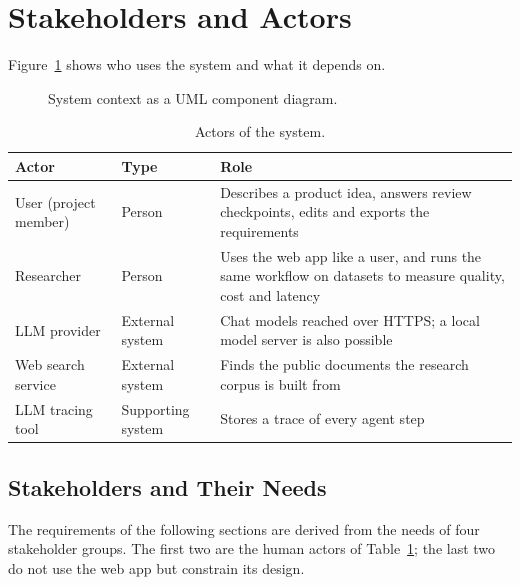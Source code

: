 \section{Stakeholders and Actors}
\label{sec:sd-actors}

Figure~\ref{fig:sd-context} shows who uses the system and what it depends on.

\begin{figure}[H]
    \centering
    \resizebox{\linewidth}{!}{}
    \caption{System context as a UML component diagram.}
    \label{fig:sd-context}
\end{figure}

\begin{table}[H]
    \centering
    \caption{Actors of the system.}
    \label{tab:sd-actors}
    \begin{tabularx}{\linewidth}{|l|l|X|}
        \hline
        \textbf{Actor} & \textbf{Type} & \textbf{Role} \\
        \hline
        User (project member) & Person & Describes a product idea, answers review checkpoints, edits and exports the requirements \\
        Researcher & Person & Uses the web app like a user, and runs the same workflow on datasets to measure quality, cost and latency \\
        LLM provider & External system & Chat models reached over HTTPS; a local model server is also possible \\
        Web search service & External system & Finds the public documents the research corpus is built from \\
        LLM tracing tool & Supporting system & Stores a trace of every agent step \\
        \hline
    \end{tabularx}
\end{table}

\subsection{Stakeholders and Their Needs}
\label{sec:sd-stakeholders}
The requirements of the following sections are derived from the needs of four stakeholder groups. The first two are the human actors of Table~\ref{tab:sd-actors}; the last two do not use the web app but constrain its design.

